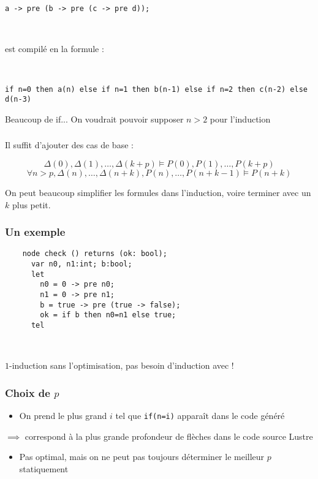 \documentclass[18pt]{beamer}
\begin{document}
\section{\optimisation}
\begin{frame}[fragile]
	\frametitle{\optimisation}
	
	\texttt{a -> pre (b -> pre (c -> pre d));}
	
	\
	
	est compilé en la formule :
	
	\
	
	\texttt{if n=0 then a(n) else if n=1 then b(n-1) else if n=2 then c(n-2) else d(n-3)}
	
	\bigskip
	
	Beaucoup de if... On voudrait pouvoir supposer $n>2$ pour l'induction
\end{frame}
\begin{frame}
	\frametitle{\optimisation}
	Il suffit d'ajouter des cas de base :
	
	$$\Delta(0), \Delta(1), \ldots, \Delta(k+p) \models P(0), P(1), \ldots, P(k+p)$$
	$$\forall n>p, {\Delta(n), \ldots, \Delta(n+k), P(n), \ldots, P(n+k-1) \models P(n+k)}$$
	
	On peut beaucoup simplifier les formules dans l'induction, voire terminer avec un $k$ plus petit.
\end{frame}
\begin{frame}[fragile]
	\frametitle{Un exemple}
	\begin{lstlisting}
	node check () returns (ok: bool);
	  var n0, n1:int; b:bool;
	  let
	    n0 = 0 -> pre n0;
	    n1 = 0 -> pre n1;
	    b = true -> pre (true -> false);
	    ok = if b then n0=n1 else true;
	  tel
	\end{lstlisting}
	
	\
	
	$1$-induction sans l'optimisation, pas besoin d'induction avec !
\end{frame}
\begin{frame}
	\frametitle{Choix de $p$}
	\begin{itemize}
	\item On prend le plus grand $i$ tel que \texttt{if(n=i)} apparaît dans le code généré
	\end{itemize}
	$\implies$ correspond à la plus grande profondeur de flèches dans le code source Lustre
	
	\begin{itemize}
		\item Pas optimal, mais on ne peut pas toujours déterminer le meilleur $p$ statiquement
	\end{itemize}
\end{frame}
\end{document}
